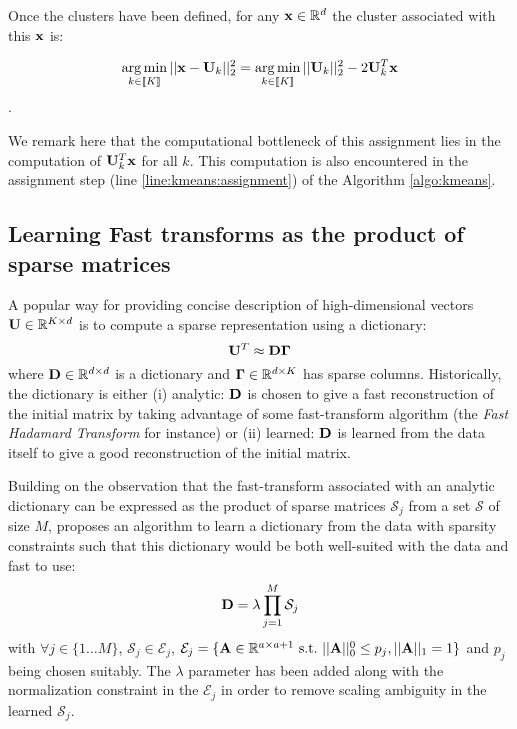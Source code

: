 Once the clusters have been defined, for any ${\mathbf{x}} \in \mathbb{R}^d$ the cluster associated with this ${\mathbf{x}}$ is:

\begin{equation}
\label{eq:assignment_problem_kmeans}
\operatorname*{arg\,min}_{k \in [\![K]\!]} ||{\mathbf{x}} - {\mathbf{U}}_{k}||_2^2 = \operatorname*{arg\,min}_{k \in [\![K]\!]} ||{\mathbf{U}}_{k}||_2^2 - 2 {\mathbf{U}}_{k}^T{\mathbf{x}}
\end{equation}.


We remark here that the computational bottleneck of this assignment lies in the computation of ${\mathbf{U}}_k^T{\mathbf{x}}$ for all $k$. This computation is also encountered in the assignment step (line \ref{line:kmeans:assignment}) of the Algorithm \ref{algo:kmeans}.


\subsection{Learning Fast transforms as the product of sparse matrices}
\label{sec:palm4led}
A popular way for providing concise description of high-dimensional vectors ${\mathbf{U}} \in \mathbb{R}^{K \times d}$ is to compute a sparse representation using a dictionary:
%
\begin{equation}
{\mathbf{U}}^T \approx {\mathbf{D}}{\mathbf{\Gamma}}
\end{equation}
%
where ${\mathbf{D}} \in \mathbb{R}^{d \times d}$ is a dictionary and ${\mathbf{\Gamma}} \in \mathbb{R}^{d \times K}$ has sparse columns. Historically, the dictionary is either (i) analytic: ${\mathbf{D}}$ is chosen to give a fast reconstruction of the initial matrix by taking advantage of some fast-transform algorithm (the \textit{Fast Hadamard Transform} for instance) or (ii) learned: ${\mathbf{D}}$ is learned from the data itself to give a good reconstruction of the initial matrix.

Building on the observation that the fast-transform associated with an analytic dictionary can be expressed as the product of sparse matrices $\mathcal{S}_j$ from a set $\mathcal{S}$ of size $M$, \cite{magoarou2014learning} proposes an algorithm to learn a dictionary from the data with sparsity constraints such that this dictionary would be both well-suited with the data and fast to use:
%
\begin{equation}
{\mathbf{D}} = \lambda \prod_{j=1}^{M}\mathcal{S}_j
\end{equation}
%
with $\forall j \in \{1 \ldots M\}$, $\mathcal{S}_j \in \mathcal{E}_j$, $\mathcal{E}_j = \lbrace {\mathbf{A}} \in \mathbb{R}^{a \times a+1}~\text{s.t.}~||{\mathbf{A}}||_0^0 \leq p_j, ||{\mathbf{A}}||_1 = 1 \rbrace$ and $p_j$ being chosen suitably. The $\lambda$ parameter has been added along with the normalization constraint in the $\mathcal{E}_j$ in order to remove scaling ambiguity in the learned $\mathcal{S}_j$.

